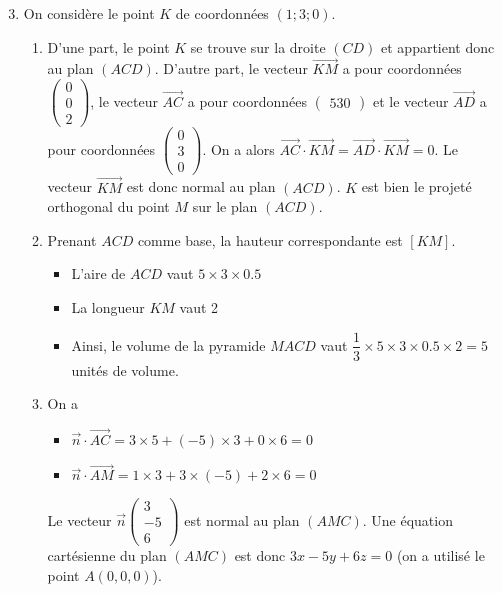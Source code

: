 \documentclass[11pt,fleqn, openany]{book} %
\begin{document}
\begin{solution}
\begin{enumerate}
\setcounter{enumi}{2}
\item On considère le point $K$ de coordonnées $(1; 3; 0)$.
\begin{enumerate}
\item D'une part, le point $K$ se trouve sur la droite $(CD)$ et appartient donc au plan $(ACD)$. D'autre part, le vecteur $\overrightarrow{KM}$ a pour coordonnées $\begin{pmatrix}0\\0\\2\end{pmatrix}$, le vecteur $\overrightarrow{AC}$ a pour coordonnées $\begin{pmatrix}{5}{3}{0}\end{pmatrix}$ et le vecteur $\overrightarrow{AD}$ a pour coordonnées $\begin{pmatrix}0\\3\\0\end{pmatrix}$. On a alors $\overrightarrow{AC}\cdot \overrightarrow{KM} = \overrightarrow{AD} \cdot \overrightarrow{KM}=0$. Le vecteur $\overrightarrow{KM}$ est donc normal au plan $(ACD)$. $K$ est bien le projeté orthogonal du point $M$ sur le plan $(ACD)$.
\item Prenant $ACD$ comme base, la hauteur correspondante est $[KM]$. 
\begin{itemize}
\item L'aire de $ACD$ vaut $5 \times 3 \times 0.5$
\item La longueur $KM$ vaut 2
\item Ainsi, le volume de la pyramide $MACD$ vaut $\dfrac{1}{3} \times 5 \times 3 \times 0.5 \times 2 = 5$ unités de volume.\end{itemize}
\item On a
\begin{itemize}
\item $\vec n \cdot \overrightarrow{AC} = 3 \times 5 + (-5) \times 3 + 0 \times 6 = 0$
\item $\vec n \cdot \overrightarrow{AM} = 1 \times 3 + 3 \times (-5) + 2 \times 6 = 0$\end{itemize}
Le vecteur $\vec n \begin{pmatrix}
3 \\ -5 \\ 6
\end{pmatrix}$ est normal au plan $(AMC)$. Une équation cartésienne du plan $(AMC)$ est donc $3x-5y+6z=0$ (on a utilisé le point $A(0,0,0)$).

\end{enumerate}
\end{enumerate}
\end{solution}
\end{document}
